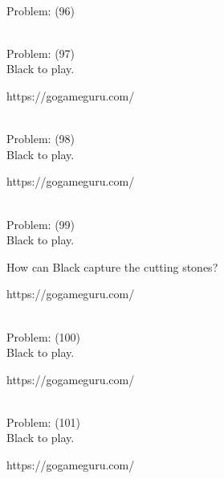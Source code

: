 \documentclass[11pt]{article}
\begin{document}
\begin{minipage}[t]{0.5\textwidth}
  {\centering
  
\\
Problem: (96)\\
  }
\end{minipage}
\begin{minipage}[t]{0.5\textwidth}
  {\centering
  
\\
Problem: (97)\\
Black to play.

https://gogameguru.com/\\
  }
\end{minipage}
\begin{minipage}[t]{0.5\textwidth}
  {\centering
  
\\
Problem: (98)\\
Black to play.

https://gogameguru.com/\\
  }
\end{minipage}
\begin{minipage}[t]{0.5\textwidth}
  {\centering
  
\\
Problem: (99)\\
Black to play.

How can Black capture the cutting stones?

https://gogameguru.com/\\
  }
\end{minipage}
\begin{minipage}[t]{0.5\textwidth}
  {\centering
  
\\
Problem: (100)\\
Black to play.

https://gogameguru.com/\\
  }
\end{minipage}
\begin{minipage}[t]{0.5\textwidth}
  {\centering
  
\\
Problem: (101)\\
Black to play.

https://gogameguru.com/\\
  }
\end{minipage}
\end{document}
